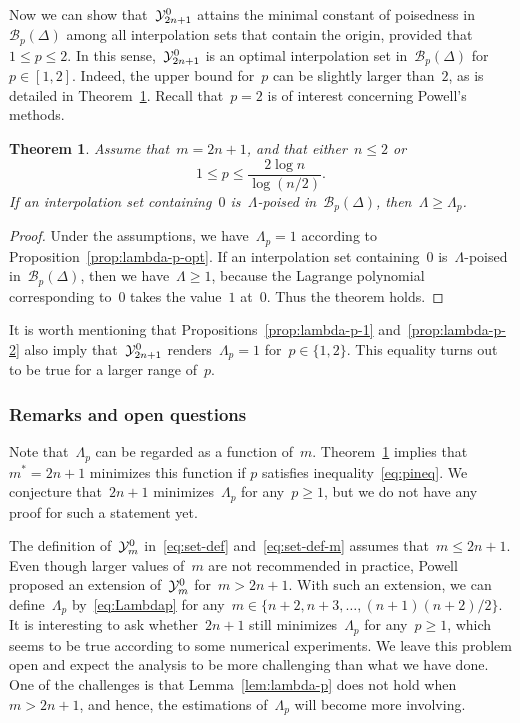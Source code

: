 \documentclass[draft]{article}
\numberwithin{equation}{section}
\theoremstyle{definition}
\theoremstyle{plain}
\newtheorem{theorem}{Theorem}[section]
\theoremstyle{remark}
\newcommand*{\set}[2][]{#1\{#2#1\}}
\newcommand*{\xpt}[1][]{\mathcal{Y}\ifblank{#1}{}{^{#1}}}
\begin{document}
Now we can show that~$\xpt[0]_{2n+1}$ attains the minimal constant of poisedness in~$\mathcal{B}_p(\Delta)$ among all interpolation sets that contain the origin, provided that~$1 \le p\le 2$.
In this sense,~$\xpt[0]_{2n + 1}$ is an optimal interpolation set in~$\mathcal{B}_p(\Delta)$ for~$p \in [1, 2]$.
Indeed, the upper bound for~$p$ can be slightly larger than~$2$, as is detailed in Theorem~\ref{th:optimset}.
Recall that~$p=2$ is of interest concerning Powell's methods.
\begin{theorem}
    \label{th:optimset}
    Assume that~$m=2n+1$, and that either~$n\le 2$ or
    \begin{equation}
        \label{eq:pineq}
        1 \le p \le \frac{2\log n}{\log (n/2)}.
    \end{equation}
    If an interpolation set containing~$0$ is~$\Lambda$-poised in~$\mathcal{B}_p(\Delta)$, then~$\Lambda \ge \Lambda_p$.
\end{theorem}

\begin{proof}
    Under the assumptions, we have~$\Lambda_p = 1$ according to Proposition~\ref{prop:lambda-p-opt}.
    If an interpolation set containing~$0$ is~$\Lambda$-poised in~$\mathcal{B}_p(\Delta)$, then we
    have~$\Lambda \ge 1$, because the Lagrange polynomial corresponding to~$0$ takes the value~$1$ at~$0$.
    Thus the theorem holds.
\end{proof}
It is worth mentioning that Propositions~\ref{prop:lambda-p-1} and~\ref{prop:lambda-p-2} also imply that~$\xpt[0]_{2n+1}$ renders~$\Lambda_p = 1$ for~$p \in \set{1, 2}$.
This equality turns out to be true for a larger range of~$p$.



\subsubsection{Remarks and open questions}

Note that~$\Lambda_p$ can be regarded as a function of~$m$. Theorem~\ref{th:optimset} implies that~$m^\ast = 2n+1$ minimizes this function if $p$ satisfies inequality~\eqref{eq:pineq}.
We conjecture that~$2n+1$ minimizes~$\Lambda_p$ for any~$p \ge 1$, but we do not have any proof for such a statement yet.

The definition of~$\xpt[0]_m$ in~\eqref{eq:set-def} and~\eqref{eq:set-def-m} assumes that~$m \le 2n + 1$.
Even though larger values of~$m$ are not recommended in practice, Powell~\cite{Powell_2006} proposed
an extension of~$\xpt[0]_m$ for~$m>2n+1$.
With such an extension, we can define~$\Lambda_p$ by~\eqref{eq:Lambdap} for any~$m \in \{n+2, n+3, \dots, (n+1)(n+2)/2\}$.
It is interesting to ask whether~$2n + 1$ still minimizes~$\Lambda_p$ for any~$p \ge 1$, which seems to be true according to some numerical experiments.
We leave this problem open and expect the analysis to be more challenging than what we have done.
One of the challenges is that Lemma~\ref{lem:lambda-p} does not hold when~$m > 2n + 1$, and hence, the estimations of~$\Lambda_p$ will become more involving.
\end{document}
